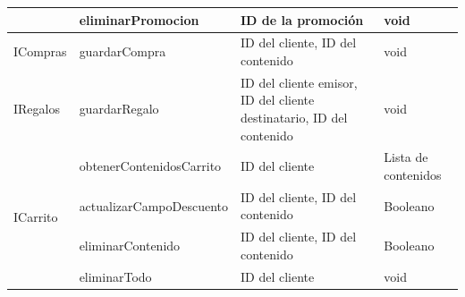 \begin{longtable}{|p{5cm}|p{4cm}|p{3.5cm}|p{3.5cm}|}
    & eliminarPromocion & ID de la promoción & void \\ \hline
\multirow{1}{5cm}{ICompras} 
    & guardarCompra & ID del cliente, ID del contenido & void \\ \hline
\multirow{1}{5cm}{IRegalos} 
    & guardarRegalo & ID del cliente emisor, ID del cliente destinatario, ID del contenido & void \\ \hline
\multirow{4}{5cm}{ICarrito}
    & obtenerContenidosCarrito & ID del cliente & Lista de contenidos \\ \cline{2-4}
    & actualizarCampoDescuento & ID del cliente, ID del contenido & Booleano \\ \cline{2-4}
    & eliminarContenido & ID del cliente, ID del contenido & Booleano \\ \cline{2-4}
    & eliminarTodo & ID del cliente & void \\ \hline

\end{longtable}

